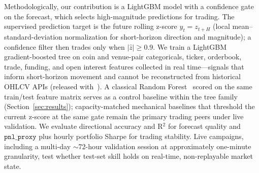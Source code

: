 Methodologically, our contribution is a LightGBM model with a confidence gate on the forecast, which selects high-magnitude predictions for trading. The supervised prediction target is the future rolling z-score $y_t = z_{t+H}$ (local mean--standard-deviation normalization for short-horizon direction and magnitude); a confidence filter then trades only when $|\hat{z}| \geq 0.9$. We train a LightGBM~\cite{ke2017lightgbm} gradient-boosted tree on coin and venue-pair categoricals, ticker, orderbook, trade, funding, and open interest features collected in real time---signals that inform short-horizon movement and cannot be reconstructed from historical OHLCV APIs (released with~\datasetref). A classical Random Forest~\cite{breiman2001random} scored on the same train/test feature matrix serves as a control baseline within the tree family (Section~\ref{sec:results}); capacity-matched mechanical baselines that threshold the current z-score at the same gate remain the primary trading peers under live validation. We evaluate directional accuracy and R$^2$ for forecast quality and $\texttt{pnl\_proxy}$ plus hourly portfolio Sharpe for trading stability. Live campaigns, including a multi-day $\sim$72-hour validation session at approximately one-minute granularity, test whether test-set skill holds on real-time, non-replayable market state.
